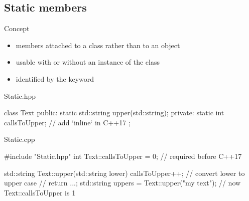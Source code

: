 \subsection[static]{Static members}

\begin{frame}[fragile]
  \begin{block}{Concept}
    \begin{itemize}
    \item members attached to a class rather than to an object
    \item usable with or without an instance of the class
    \item identified by the  keyword
    \end{itemize}
  \end{block}

  \vspace{-1\baselineskip}
  \begin{overprint}
  \begin{exampleblock}{Static.hpp}
  \begin{cppcode}
    class Text {
    public:
      static std::string upper(std::string);
    private:
      static int callsToUpper; // add `inline` in C++17
    };
  \end{cppcode}
  \end{exampleblock}

  \begin{exampleblock}{Static.cpp}
  \begin{cppcode}
    #include "Static.hpp"
    int Text::callsToUpper = 0; // required before C++17

    std::string Text::upper(std::string lower) {
      callsToUpper++;
      // convert lower to upper case
      // return ...;
    }
    std::string uppers = Text::upper("my text");
    // now Text::callsToUpper is 1
  \end{cppcode}
  \end{exampleblock}
  \end{overprint}
\end{frame}

